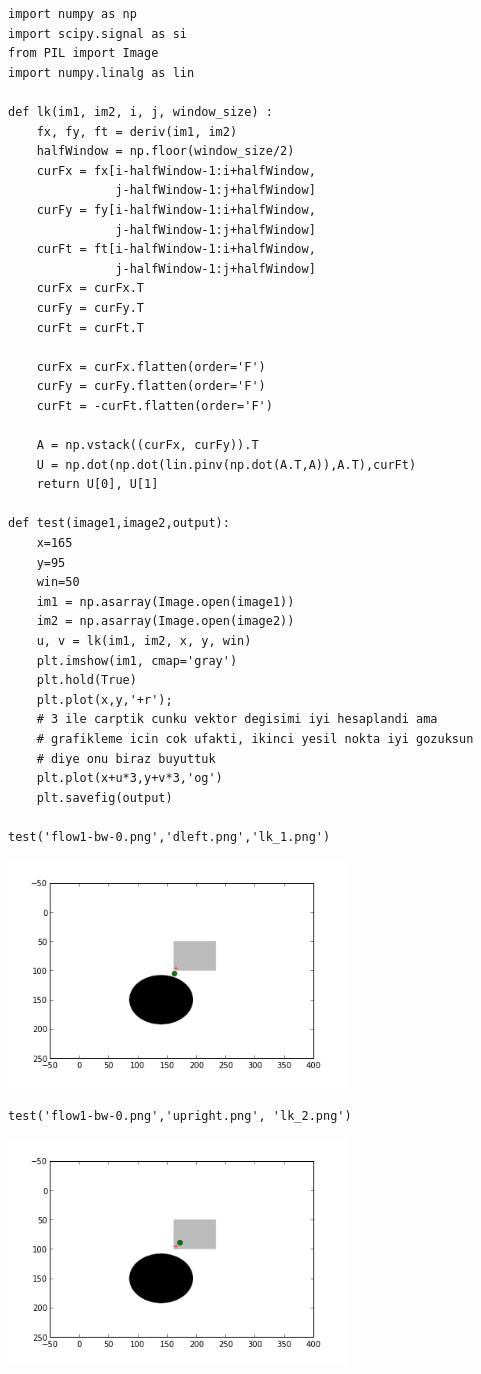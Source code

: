 \documentclass[12pt,fleqn]{article}\usepackage{../common}
\begin{document}
\begin{verbatim}
import numpy as np
import scipy.signal as si
from PIL import Image
import numpy.linalg as lin

def lk(im1, im2, i, j, window_size) :
    fx, fy, ft = deriv(im1, im2)
    halfWindow = np.floor(window_size/2)
    curFx = fx[i-halfWindow-1:i+halfWindow, 
               j-halfWindow-1:j+halfWindow]
    curFy = fy[i-halfWindow-1:i+halfWindow, 
               j-halfWindow-1:j+halfWindow]
    curFt = ft[i-halfWindow-1:i+halfWindow, 
               j-halfWindow-1:j+halfWindow]
    curFx = curFx.T
    curFy = curFy.T
    curFt = curFt.T

    curFx = curFx.flatten(order='F') 
    curFy = curFy.flatten(order='F') 
    curFt = -curFt.flatten(order='F') 
    
    A = np.vstack((curFx, curFy)).T
    U = np.dot(np.dot(lin.pinv(np.dot(A.T,A)),A.T),curFt)
    return U[0], U[1]

def test(image1,image2,output): 
    x=165
    y=95
    win=50
    im1 = np.asarray(Image.open(image1))
    im2 = np.asarray(Image.open(image2))
    u, v = lk(im1, im2, x, y, win)
    plt.imshow(im1, cmap='gray')
    plt.hold(True)
    plt.plot(x,y,'+r');
    # 3 ile carptik cunku vektor degisimi iyi hesaplandi ama
    # grafikleme icin cok ufakti, ikinci yesil nokta iyi gozuksun
    # diye onu biraz buyuttuk
    plt.plot(x+u*3,y+v*3,'og')
    plt.savefig(output)

test('flow1-bw-0.png','dleft.png','lk_1.png')
\end{verbatim}

\includegraphics[height=6cm]{lk_1.png}

\begin{verbatim}
test('flow1-bw-0.png','upright.png', 'lk_2.png')
\end{verbatim}

\includegraphics[height=6cm]{lk_2.png}
\end{document}
